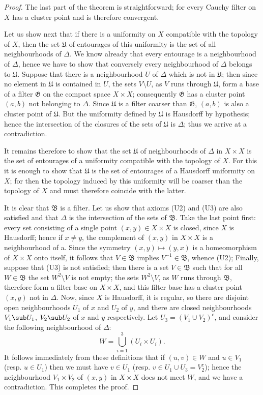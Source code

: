 \begin{proof}
The last part of the theorem is straightforward; for every Cauchy filter on $X$ has a cluster point and is therefore convergent.\par
Let us show next that if there is a uniformity on $X$ compatible with the topology of $X$, then the set $\mathfrak{U}$ of entourages of this uniformity is the set of all neighbourhoods of $\Delta$. We know already that every entourage is a neighbourhood of $\Delta$, hence we have to show that conversely every neighbourhood of $\Delta$ belongs to $\mathfrak{U}$. Suppose that there is a neighbourhood $U$ of $\Delta$ which is not in $\mathfrak{U}$; then since no element in $\mathfrak{U}$ is contained in $U$, the sets $V\setminus U$, as $V$ runs through $\mathfrak{U}$, form a base of a filter $\mathfrak{G}$ on the compact space $X\times X$; consequently $\mathfrak{G}$ has a cluster point $(a,b)$ not belonging to $\Delta$. Since $\mathfrak{U}$ is a filter coarser than $\mathfrak{G}$, $(a,b)$ is also a cluster point of $\mathfrak{U}$. But the uniformity defined by $\mathfrak{U}$ is Hausdorff by hypothesis; hence the intersection of the closures of the sets of $\mathfrak{U}$ is $\Delta$; thus we arrive at a contradiction.\par
It remains therefore to show that the set $\mathfrak{U}$ of neighbourhoods of $\Delta$ in $X\times X$ is the set of entourages of a uniformity compatible with the topology of $X$. For this it is enough to show that $\mathfrak{U}$ is the set of entourages of a Hausdorff uniformity on $X$; for then the topology induced by this uniformity will be coarser than the topology of $X$ and must therefore coincide with the latter.\par
It is clear that $\mathfrak{B}$ is a filter. Let us show that axioms (U2) and (U3) are also satisfied and that $\Delta$ is the intersection of the sets of $\mathfrak{B}$. Take the last point first: every set consisting of a single point $(x,y)\in X\times X$ is closed, since $X$ is Hausdorff; hence if $x\neq y$, the complement of $(x,y)$ in $X\times X$ is a neighbourhood of a. Since the symmetry $(x,y)\mapsto(y,x)$ is a homeomorphism of $X\times X$ onto itself, it follows that $V\in\mathfrak{B}$ implies $V^{-1}\in\mathfrak{B}$, whence (U2); Finally, suppose that (U3) is not satisfied; then there is a set $V\in\mathfrak{B}$ such that for all $W\in\mathfrak{B}$ the set $W^2\setminus V$ is not empty; the sets $W^2\setminus V$, as $W$ runs through $\mathfrak{B}$, therefore form a filter base on $X\times X$, and this filter base has a cluster point $(x,y)$ not in $\Delta$. Now, since $X$ is Hausdorff, it is regular, so there are disjoint open neighbourhoods $U_1$ of $x$ and $U_2$ of $y$, and there are closed neighbourhoods $V_1\sub U_1$, $V_2\sub U_2$ of $x$ and $y$ respectively. Let $U_3=(V_1\cup V_2)^c$, and consider the following neighbourhood of $\Delta$:
\[W=\bigcup_{i=1}^{3}(U_i\times U_i).\]
It follows immediately from these definitions that if $(u,v)\in W$ and $u\in V_1$ (resp. $u\in U_1$) then we must have $v\in U_1$ (resp. $v\in U_1\cup U_3=V_2^c$); hence the neighbourhood $V_1\times V_2$ of $(x,y)$ in $X\times X$ does not meet $W$, and we have a contradiction. This completes the proof.
\end{proof}
